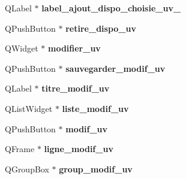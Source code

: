 \begin{DoxyCompactItemize}
\item 
\hypertarget{class_ui___administration_a8e604f94770caadb0f42b00a29b530ce}{Q\+Label $\ast$ {\bfseries label\+\_\+ajout\+\_\+dispo\+\_\+choisie\+\_\+uv\+\_}}\label{class_ui___administration_a8e604f94770caadb0f42b00a29b530ce}

\item 
\hypertarget{class_ui___administration_af52686d9c1cb3f993c6d11c0c6b4498b}{Q\+Push\+Button $\ast$ {\bfseries retire\+\_\+dispo\+\_\+uv}}\label{class_ui___administration_af52686d9c1cb3f993c6d11c0c6b4498b}

\item 
\hypertarget{class_ui___administration_ae4a1ac7ea8e5b32f2e4a79a3193984f4}{Q\+Widget $\ast$ {\bfseries modifier\+\_\+uv}}\label{class_ui___administration_ae4a1ac7ea8e5b32f2e4a79a3193984f4}

\item 
\hypertarget{class_ui___administration_ab41c816a82ca9d7786c1c90fd03f1386}{Q\+Push\+Button $\ast$ {\bfseries sauvegarder\+\_\+modif\+\_\+uv}}\label{class_ui___administration_ab41c816a82ca9d7786c1c90fd03f1386}

\item 
\hypertarget{class_ui___administration_ab7deced0949264644a7bec462a6b4050}{Q\+Label $\ast$ {\bfseries titre\+\_\+modif\+\_\+uv}}\label{class_ui___administration_ab7deced0949264644a7bec462a6b4050}

\item 
\hypertarget{class_ui___administration_a0080303e64231bea872bfb77ad1c436d}{Q\+List\+Widget $\ast$ {\bfseries liste\+\_\+modif\+\_\+uv}}\label{class_ui___administration_a0080303e64231bea872bfb77ad1c436d}

\item 
\hypertarget{class_ui___administration_a4ca202266272679aa126bd4e2c51eacc}{Q\+Push\+Button $\ast$ {\bfseries modif\+\_\+uv}}\label{class_ui___administration_a4ca202266272679aa126bd4e2c51eacc}

\item 
\hypertarget{class_ui___administration_a1e5397137dd47ba02d0f2c46bbd4524c}{Q\+Frame $\ast$ {\bfseries ligne\+\_\+modif\+\_\+uv}}\label{class_ui___administration_a1e5397137dd47ba02d0f2c46bbd4524c}

\item 
\hypertarget{class_ui___administration_ab222b8d1d8229e0f6cdb82354fba5933}{Q\+Group\+Box $\ast$ {\bfseries group\+\_\+modif\+\_\+uv}}\label{class_ui___administration_ab222b8d1d8229e0f6cdb82354fba5933}


\end{DoxyCompactItemize}

